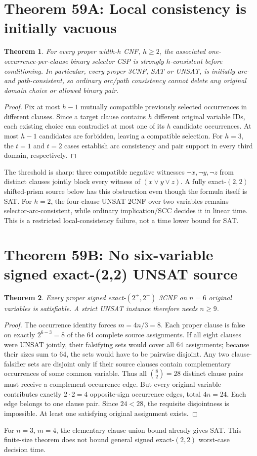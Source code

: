 \documentclass[10pt]{article}
\newtheorem{theorem}{Theorem}
\begin{document}
\section{Theorem 59A: Local consistency is initially vacuous}
\begin{theorem}
For every proper width-$h$ CNF, $h\ge2$, the associated one-occurrence-per-clause binary selector CSP is strongly $h$-consistent before conditioning. In particular, every proper 3CNF, SAT or UNSAT, is initially arc- and path-consistent, so ordinary arc/path consistency cannot delete any original domain choice or allowed binary pair.
\end{theorem}
\begin{proof}
Fix at most $h-1$ mutually compatible previously selected occurrences in different clauses. Since a target clause contains $h$ different original variable IDs, each existing choice can contradict at most one of its $h$ candidate occurrences. At most $h-1$ candidates are forbidden, leaving a compatible selection. For $h=3$, the $t=1$ and $t=2$ cases establish arc consistency and pair support in every third domain, respectively.
\end{proof}
The threshold is sharp: three compatible negative witnesses $\neg x,\neg y,\neg z$ from distinct clauses jointly block every witness of $(x\vee y\vee z)$. A fully exact-$(2,2)$ shifted-prism source below has this obstruction even though the formula itself is SAT. For $h=2$, the four-clause UNSAT 2CNF over two variables remains selector-arc-consistent, while ordinary implication/SCC decides it in linear time. This is a restricted local-consistency failure, not a time lower bound for SAT.

\section{Theorem 59B: No six-variable signed exact-(2,2) UNSAT source}
\begin{theorem}
Every proper signed exact-$(2^+,2^-)$ 3CNF on $n=6$ original variables is satisfiable. A strict UNSAT instance therefore needs $n\ge9$.
\end{theorem}
\begin{proof}
The occurrence identity forces $m=4n/3=8$. Each proper clause is false on exactly $2^{6-3}=8$ of the 64 complete source assignments. If all eight clauses were UNSAT jointly, their falsifying sets would cover all 64 assignments; because their sizes sum to 64, the sets would have to be pairwise disjoint. Any two clause-falsifier sets are disjoint only if their source clauses contain complementary occurrences of some common variable. Thus all $\binom82=28$ distinct clause pairs must receive a complement occurrence edge. But every original variable contributes exactly $2\cdot2=4$ opposite-sign occurrence edges, total $4n=24$. Each edge belongs to one clause pair. Since $24<28$, the requisite disjointness is impossible. At least one satisfying original assignment exists.
\end{proof}
For $n=3$, $m=4$, the elementary clause union bound already gives SAT. This finite-size theorem does not bound general signed exact-$(2,2)$ worst-case decision time.
\end{document}
